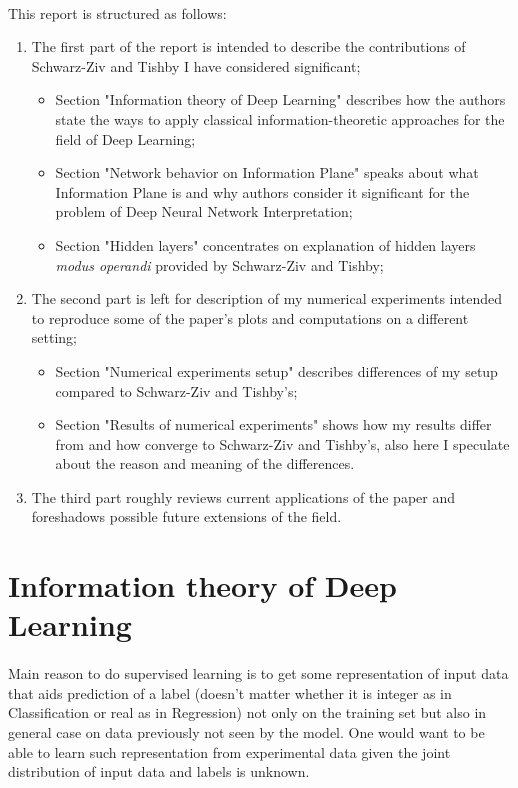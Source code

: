 \documentclass[a4paper,14pt]{extarticle}
\begin{document}
\paragraph{}
This report is structured as follows:
\begin{enumerate}
	\item The first part of the report is intended to describe the contributions of Schwarz-Ziv and Tishby I have considered significant; \begin{itemize}
		\item Section "Information theory of Deep Learning" describes how the authors state the ways to apply classical information-theoretic approaches for the field of Deep Learning;
		\item Section "Network behavior on Information Plane" speaks about what Information Plane is and why authors consider it significant for the problem of Deep Neural Network Interpretation;
		\item Section "Hidden layers" concentrates on explanation of hidden layers \textit{modus operandi} provided by Schwarz-Ziv and Tishby;
	\end{itemize}
	\item The second part is left for description of my numerical experiments intended to reproduce some of the paper's plots and computations on a different setting; \begin{itemize}
		\item Section "Numerical experiments setup" describes differences of my setup compared to Schwarz-Ziv and Tishby's;
		\item Section "Results of numerical experiments" shows how my results differ from and how converge to Schwarz-Ziv and Tishby's, also here I speculate about the reason and meaning of the differences.
	\end{itemize}
	\item The third part roughly reviews current applications of the paper and foreshadows possible future extensions of the field.
\end{enumerate}

\section{Information theory of Deep Learning}
\paragraph{}
Main reason to do supervised learning is to get some representation of input data that aids prediction of a label (doesn't matter whether it is integer as in Classification or real as in Regression) not only on the training set but also in general case on data previously not seen by the model. One would want to be able to learn such representation from experimental data given the joint distribution of input data and labels is unknown. 
\end{document}

